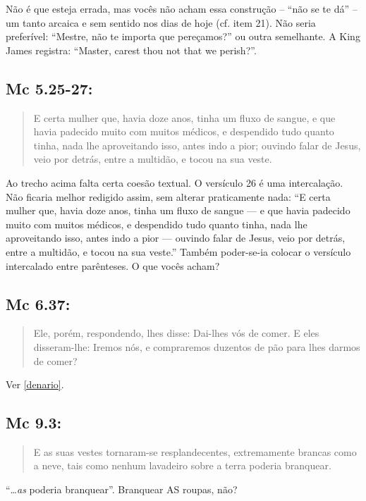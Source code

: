 Não é que esteja errada, mas vocês não acham essa construção -- ``não
se te dá'' -- um tanto arcaica e sem sentido nos dias de hoje (cf.
item 21). Não seria preferível: ``Mestre, não te importa que
pereçamos?'' ou outra semelhante. A King James registra: ``Master,
carest thou not that we perish?''.


\subsection{Mc 5.25-27:}
\begin{quote}
    \small
E certa mulher que, havia doze anos,  tinha um fluxo de sangue, e que havia padecido muito  com muitos médicos, e despendido tudo quanto tinha, nada lhe  aproveitando isso, antes indo a pior; ouvindo falar  de Jesus, veio por detrás, entre a multidão, e tocou na sua veste.
\end{quote}

Ao trecho acima falta certa coesão textual. O versículo 26 é uma
intercalação. Não ficaria melhor redigido assim, sem alterar
praticamente nada: ``E certa mulher que, havia doze
anos, tinha um fluxo de sangue --- e que havia padecido
muito com muitos médicos, e despendido tudo quanto tinha, nada lhe
aproveitando isso, antes indo a pior --- ouvindo falar
de Jesus, veio por detrás, entre a multidão, e tocou na sua veste.'' Também poder-se-ia colocar o versículo intercalado entre parênteses. O que vocês acham?


\subsection{Mc 6.37:}
\begin{quote}
    \small
Ele, porém, respondendo, lhes disse: Dai-lhes vós de
 comer. E eles disseram-lhe: Iremos nós, e compraremos
duzentos  de pão para lhes darmos de comer?
\end{quote}
Ver \ref{denario}.


\subsection{Mc 9.3:}
\begin{quote}
    \small
E as suas vestes tornaram-se resplandecentes, extremamente brancas como a neve, tais como nenhum lavadeiro sobre a terra  poderia branquear.
\end{quote}

``\ldots \emph{as} poderia branquear''. Branquear AS roupas, não?


